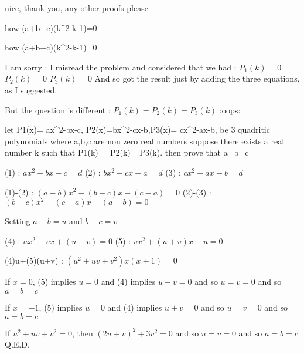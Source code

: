 \begin{solution}
	nice, thank you, any other proofs please
\end{solution}



\begin{solution}
	how (a+b+c)(k^2-k-1)=0
\end{solution}



\begin{solution}
	\begin{tcolorbox}how (a+b+c)(k^2-k-1)=0\end{tcolorbox}

I am sorry : I misread the problem and considered that we had :
$P_1(k)=0$
$P_2(k)=0$
$P_3(k)=0$
And so got the result just by adding the three equations, as I suggested.

But the question is different : $P_1(k)=P_2(k)=P_3(k)$
:oops:
\end{solution}



\begin{solution}
	\begin{tcolorbox}let P1(x)= ax^2-bx-c, P2(x)=bx^2-cx-b,P3(x)= cx^2-ax-b, be 3 quadritic polynomials  where a,b,c are non zero real numbers suppose there exists a real number k such that  P1(k) = P2(k)= P3(k). then prove that a=b=c\end{tcolorbox}
(1) : $ax^2-bx-c=d$
(2) : $bx^2-cx-a=d$
(3) : $cx^2-ax-b=d$

(1)-(2) : $(a-b)x^2-(b-c)x-(c-a)=0$
(2)-(3) : $(b-c)x^2-(c-a)x-(a-b)=0$

Setting $a-b=u$ and $b-c=v$

(4) : $ux^2-vx+(u+v)=0$
(5) : $vx^2+(u+v)x-u=0$

(4)u+(5)(u+v) : $(u^2+uv+v^2)x(x+1)=0$

If $x=0$, (5) implies $u=0$ and (4) implies $u+v=0$ and so $u=v=0$ and so $a=b=c$

If $x=-1$, (5) implies $u=0$ and (4) implies $u+v=0$ and so $u=v=0$ and so $a=b=c$

If $u^2+uv+v^2=0$, then $(2u+v)^2+3v^2=0$ and so $u=v=0$ and so $a=b=c$
Q.E.D.
\end{solution}



